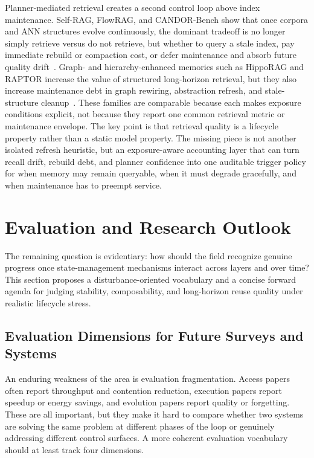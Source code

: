 \documentclass[acmsmall,screen,review]{acmart}
\begin{document}
Planner-mediated retrieval creates a second control loop above index maintenance. Self-RAG, FlowRAG, and CANDOR-Bench show that once corpora and ANN structures evolve continuously, the dominant tradeoff is no longer simply retrieve versus do not retrieve, but whether to query a stale index, pay immediate rebuild or compaction cost, or defer maintenance and absorb future quality drift~\cite{asai2024selfrag,zhang2026flowrag,wang2026candor}. Graph- and hierarchy-enhanced memories such as HippoRAG and RAPTOR increase the value of structured long-horizon retrieval, but they also increase maintenance debt in graph rewiring, abstraction refresh, and stale-structure cleanup~\cite{wang2024hipporag,sarthi2024raptor}. These families are comparable because each makes exposure conditions explicit, not because they report one common retrieval metric or maintenance envelope. The key point is that retrieval quality is a lifecycle property rather than a static model property. The missing piece is not another isolated refresh heuristic, but an exposure-aware accounting layer that can turn recall drift, rebuild debt, and planner confidence into one auditable trigger policy for when memory may remain queryable, when it must degrade gracefully, and when maintenance has to preempt service.

\section{Evaluation and Research Outlook}
\label{sec:evaluation-outlook}

The remaining question is evidentiary: how should the field recognize genuine progress once state-management mechanisms interact across layers and over time? This section proposes a disturbance-oriented vocabulary and a concise forward agenda for judging stability, composability, and long-horizon reuse quality under realistic lifecycle stress.

\subsection{Evaluation Dimensions for Future Surveys and Systems}

An enduring weakness of the area is evaluation fragmentation. Access papers often report throughput and contention reduction, execution papers report speedup or energy savings, and evolution papers report quality or forgetting. These are all important, but they make it hard to compare whether two systems are solving the same problem at different phases of the loop or genuinely addressing different control surfaces. A more coherent evaluation vocabulary should at least track four dimensions.
\end{document}
